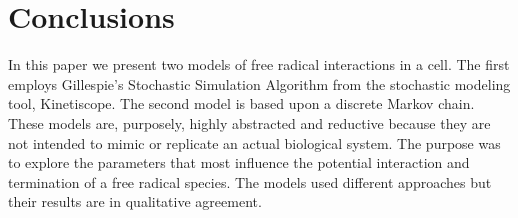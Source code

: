 \documentclass[preprint,12pt,authoryear]{elsarticle}
\begin{document}
%

\section{Conclusions}


In this paper we present two models of free radical interactions in a cell. The first employs
Gillespie’s Stochastic Simulation Algorithm from the stochastic modeling tool, Kinetiscope. The second
model is based upon a discrete Markov chain. 
These models are, purposely, highly abstracted and reductive because they are not intended to mimic or replicate an actual biological system. 
The purpose was to explore the parameters that most influence the potential interaction and termination of a free radical species. 
The models used different approaches but their results are in qualitative agreement.  
\end{document}
